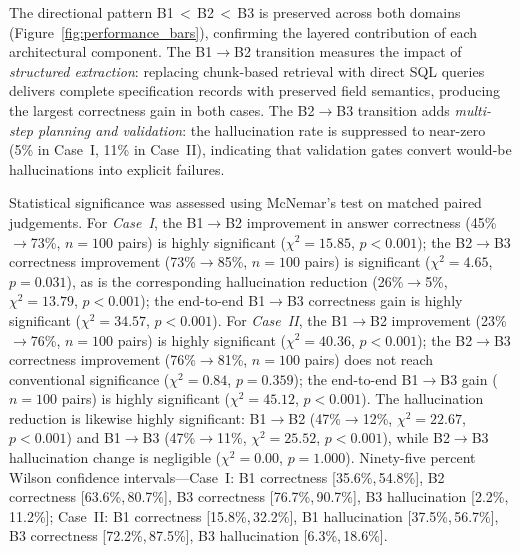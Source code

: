 \documentclass[largeformat]{interact}
\begin{document}
The directional pattern B1\,$<$\,B2\,$<$\,B3 is preserved across both domains (Figure~\ref{fig:performance_bars}), confirming the layered contribution of each architectural component. The B1$\rightarrow$B2 transition measures the impact of \emph{structured extraction}: replacing chunk-based retrieval with direct SQL queries delivers complete specification records with preserved field semantics, producing the largest correctness gain in both cases. The B2$\rightarrow$B3 transition adds \emph{multi-step planning and validation}: the hallucination rate is suppressed to near-zero (5\% in Case~I, 11\% in Case~II), indicating that validation gates convert would-be hallucinations into explicit failures.

Statistical significance was assessed using McNemar's test on matched paired judgements. For \textit{Case~I}, the B1$\rightarrow$B2 improvement in answer correctness (45\%$\rightarrow$73\%, $n = 100$ pairs) is highly significant ($\chi^2 = 15.85$, $p < 0.001$); the B2$\rightarrow$B3 correctness improvement (73\%$\rightarrow$85\%, $n = 100$ pairs) is significant ($\chi^2 = 4.65$, $p = 0.031$), as is the corresponding hallucination reduction (26\%$\rightarrow$5\%, $\chi^2 = 13.79$, $p < 0.001$); the end-to-end B1$\rightarrow$B3 correctness gain is highly significant ($\chi^2 = 34.57$, $p < 0.001$).
For \textit{Case~II}, the B1$\rightarrow$B2 improvement (23\%$\rightarrow$76\%, $n = 100$ pairs) is highly significant ($\chi^2 = 40.36$, $p < 0.001$); the B2$\rightarrow$B3 correctness improvement (76\%$\rightarrow$81\%, $n = 100$ pairs) does not reach conventional significance ($\chi^2 = 0.84$, $p = 0.359$); the end-to-end B1$\rightarrow$B3 gain ($n = 100$ pairs) is highly significant ($\chi^2 = 45.12$, $p < 0.001$). The hallucination reduction is likewise highly significant: B1$\rightarrow$B2 (47\%$\rightarrow$12\%, $\chi^2 = 22.67$, $p < 0.001$) and B1$\rightarrow$B3 (47\%$\rightarrow$11\%, $\chi^2 = 25.52$, $p < 0.001$), while B2$\rightarrow$B3 hallucination change is negligible ($\chi^2 = 0.00$, $p = 1.000$). Ninety-five percent Wilson confidence intervals---Case~I: B1 correctness [35.6\%,\,54.8\%], B2 correctness [63.6\%,\,80.7\%], B3 correctness [76.7\%,\,90.7\%], B3 hallucination [2.2\%,\,11.2\%]; Case~II: B1 correctness [15.8\%,\,32.2\%], B1 hallucination [37.5\%,\,56.7\%], B3 correctness [72.2\%,\,87.5\%], B3 hallucination [6.3\%,\,18.6\%].

\end{document}
